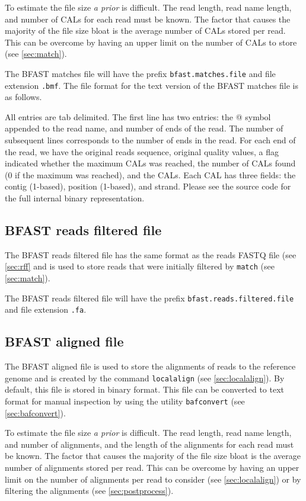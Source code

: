 \documentclass[a4paper,12pt]{book}
\newcommand{\TT}[1]{{\tt #1}} %
\newcommand{\IF}[1]{{\it #1}} %
\newcommand{\rFF}{reads FASTQ file}
\newcommand{\BMF}{BFAST matches file} %
\newcommand{\BRFF}{BFAST reads filtered file} %
\newcommand{\BAF}{BFAST aligned file} %
\begin{document}
To estimate the file size \IF{a prior} is difficult.
The read length, read name length, and number of CALs for each read must be known.
The factor that causes the majority of the file size bloat is the average number of CALs stored per read.
This can be overcome by having an upper limit on the number of CALs to store (see \autoref{sec:match}).

The \BMF{} will have the prefix \TT{bfast.matches.file} and file extension \TT{.bmf}.
The file format for the text version of the \BMF{} is as follows.

All entries are tab delimited.
The first line has two entries: the @ symbol appended to the read name, and number of ends of the read.
The number of subsequent lines corresponds to the number of ends in the read.
For each end of the read, we have the original reads sequence, original quality values, a flag indicated whether the maximum CALs was reached, the number of CALs found (0 if the maximum was reached), and the CALs.
Each CAL has three fields: the contig (1-based), position (1-based), and strand.
Please see the source code for the full internal binary representation.

\subsection{\BRFF{}}
\label{sec:brff}
The \BRFF{} has the same format as the \rFF{} (see \autoref{sec:rff} and is used to store reads that were initially filtered by \TT{match} (see \autoref{sec:match}).

The \BRFF{} will have the prefix \TT{bfast.reads.filtered.file} and file extension \TT{.fa}.

\subsection{\BAF{}}
\label{sec:baf} 
The \BAF{} is used to store the alignments of reads to the reference genome and is created by the command \TT{localalign} (see \autoref{sec:localalign}).
By default, this file is stored in binary format.
This file can be converted to text format for manual inspection by using the utility \TT{bafconvert} (see \autoref{sec:bafconvert}).

To estimate the file size \IF{a prior} is difficult.
The read length, read name length, and number of alignments, and the length of the alignments for each read must be known.
The factor that causes the majority of the file size bloat is the average number of alignments stored per read.
This can be overcome by having an upper limit on the number of alignments per read to consider (see \autoref{sec:localalign}) or by filtering the alignments (see \autoref{sec:postprocess}).
\end{document}
